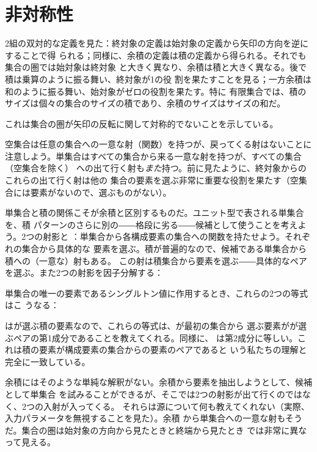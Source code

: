 
\section{非対称性}

2組の双対的な定義を見た：終対象の定義は始対象の定義から矢印の方向を逆にすることで得
られる；同様に、余積の定義は積の定義から得られる。それでも集合の圏では始対象は終対象
と大きく異なり、余積は積と大きく異なる。後で積は乗算のように振る舞い、終対象が1の役
割を果たすことを見る；一方余積は和のように振る舞い、始対象がゼロの役割を果たす。特に
有限集合では、積のサイズは個々の集合のサイズの積であり、余積のサイズはサイズの和だ。

これは集合の圏が矢印の反転に関して対称的でないことを示している。

空集合は任意の集合への一意な射（関数）を持つが、戻ってくる射はないことに
注意しよう。単集合はすべての集合から来る一意な射を持つが、すべての集合（空集合を除く）
への出て行く射も\emph{また}持つ。前に見たように、終対象からのこれらの出て行く射は他の
集合の要素を選ぶ非常に重要な役割を果たす（空集合には要素がないので、選ぶものがない）。

単集合と積の関係こそが余積と区別するものだ。ユニット型\code{()}で表される単集合を、積
パターンのさらに別の――格段に劣る――候補として使うことを考えよう。2つの射影と
：単集合から各構成要素の集合への関数を持たせよう。それぞれの集合から具体的な
要素を選ぶ。積が普遍的なので、候補である単集合から積への（一意な）射もある。
この射は積集合から要素を選ぶ――具体的なペアを選ぶ。また2つの射影を因子分解する：

単集合の唯一の要素であるシングルトン値\code{()}に作用するとき、これらの2つの等式はこ
うなる：

はが選ぶ積の要素なので、これらの等式は、が最初の集合から
選ぶ要素がが選ぶペアの第1成分であることを教えてくれる。同様に、
は第2成分に等しい。これは積の要素が構成要素の集合からの要素のペアであると
いう私たちの理解と完全に一致している。

余積にはそのような単純な解釈がない。余積から要素を抽出しようとして、候補として単集合
を試みることができるが、そこでは2つの射影が出て行くのではなく、2つの入射が入ってくる。
それらは源について何も教えてくれない（実際、入力パラメータを無視することを見た）。余積
から単集合への一意な射もそうだ。集合の圏は始対象の方向から見たときと終端から見たとき
では非常に異なって見える。


